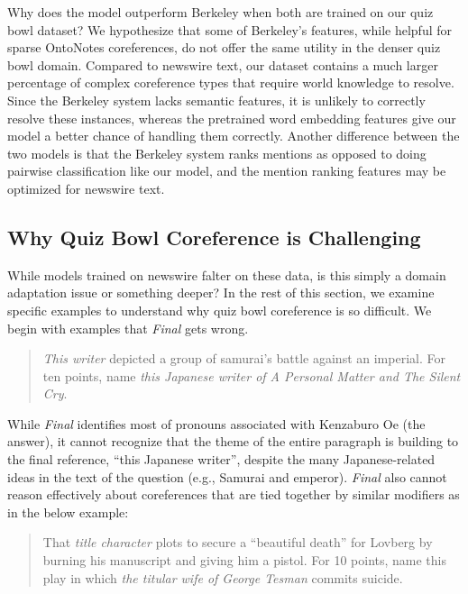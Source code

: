 Why does the  model outperform Berkeley when both are trained on our
quiz bowl dataset? We hypothesize that some of Berkeley's features, while
helpful for sparse OntoNotes coreferences, do not offer the same utility in the
denser quiz bowl domain. Compared to newswire text, our dataset contains a much
larger percentage of complex coreference types that require world knowledge to
resolve. Since the Berkeley system lacks semantic features, it is unlikely to
correctly resolve these instances, whereas the pretrained word embedding
features give our  model a better chance of handling them correctly.
Another difference between the two models is that the Berkeley system ranks
mentions as opposed to doing pairwise classification like our  model,
and the mention ranking features may be optimized for newswire text.
























\subsection{Why Quiz Bowl Coreference is Challenging}

While models trained on newswire falter on these data, is this simply a domain
adaptation issue or something deeper?  In the rest of this section, we examine
specific examples to understand why quiz bowl coreference is so difficult. We
begin with examples that \emph{Final} gets wrong.

\begin{quote}
  \emph{This writer} depicted a group of samurai's battle against an imperial. For
  ten points, name \emph{this Japanese writer of A Personal Matter and The
    Silent Cry}.
\end{quote}

While \emph{Final} identifies most of pronouns associated with Kenzaburo Oe (the
answer), it cannot recognize that the theme of the entire paragraph is building
to the final reference, ``this Japanese writer'', despite the many
Japanese-related ideas in the text of the question (e.g., Samurai and
emperor). \emph{Final} also cannot reason effectively about coreferences that
are tied together by similar modifiers as in the below example:
\begin{quote}
  That \emph{title character} plots to secure a ``beautiful death'' for Lovberg
  by burning his manuscript and giving him a pistol. For 10 points, name this
  play in which \emph{the titular wife of George Tesman} commits suicide.
\end{quote}

